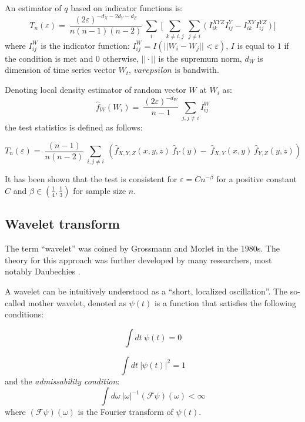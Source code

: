 An estimator of $q$ based on indicator functions is:
\begin{equation}
    T_n(\varepsilon)= \
    \frac{(2\varepsilon)^{-d_X -2d_Y -d_Z}}{n(n-1)(n-2)} \
    \sum_i \
    \bigg[ \
    \sum_{k \neq i,j} \
    \sum_{j \neq i} \
    \Big( \
    I^{XYZ}_{ik} I^{Y}_{ij} - I^{XY}_{ik} I^{YZ}_{ij} \
    \Big) \
    \bigg]
\end{equation}
where $I^W_{ij}$ is the indicator function: $I^W_{ij} = I(||W_i-W_j||<\varepsilon)$, $I$ is equal to $1$ if the condition is met and $0$ otherwise,
$||\cdot||$ is the supremum norm,
$d_W$ is dimension of time series vector $W_t$,
$varepsilon$ is bandwith.
   
Denoting local density estimator of random vector $W$ at $W_i$ as:
\begin{equation}
    \hat{f}_W(W_i)=\
    \frac{(2\varepsilon)^{-d_W}}{n-1}\
    \sum_{j,j \neq i} I^W_{ij}
\end{equation}
the test statistics is defined as follows:

\begin{equation} \label{eq:diks-panchenko-test}
    T_n(\varepsilon) = \
    \frac{(n-1)}{n(n-2)} \
    \sum_{i,j \neq i} \
    (\hat{f}_{X,Y,Z}(x,y,z) \
    \hat{f}_Y(y) - \
    \hat{f}_{X,Y}(x,y) \
    \hat{f}_{Y,Z}(y,z))
\end{equation}

It has been shown that the test is consistent for $\varepsilon = C n^{-\beta}$ for a positive constant $C$ and $\beta \in (\frac{1}{4}, \frac{1}{3})$ for sample size $n$.

\subsection{Wavelet transform} \label{sec:wavelet}
The term ``wavelet'' was coined by Grossmann and Morlet \cite{grossmann-morlet}  in the 1980s. 
The theory for this approach was further developed by many researchers, most notably Daubechies \cite{daubechies1990}.

A wavelet can be intuitively understood as a ``short, localized oscillation''.
The so-called mother wavelet, denoted as $\psi(t)$ is a function that satisfies the following conditions:

\begin{equation} \label{eq:wavelet-zero-mean}
	\int\! dt \: \psi (t) = 0
\end{equation}

\begin{equation} \label{eq:wavelet-norm}
	\int\! dt \: |\psi (t)|^2 = 1
\end{equation}
and the \emph{admissability condition}:
\begin{equation}
	\int\! d\omega \: |\omega|^{-1} \left(\mathscr{F} \psi\right)(\omega) < \infty
\end{equation}
where $\left(\mathscr{F} \psi\right)(\omega)$ is the Fourier transform of $\psi(t)$.

